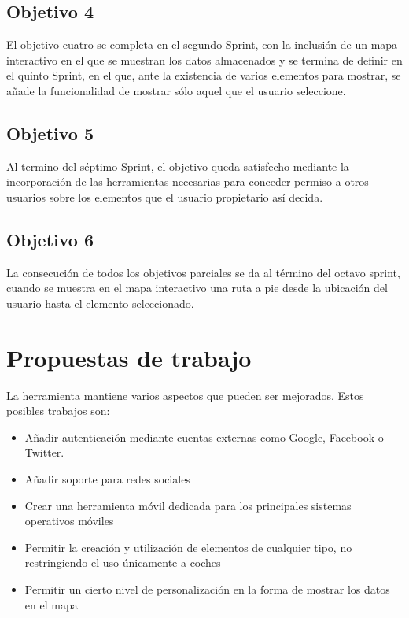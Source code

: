 \subsection{Objetivo 4}
El objetivo cuatro se completa en el segundo Sprint, con la inclusión de un mapa interactivo en el que se muestran los datos almacenados y se termina de definir en el quinto Sprint, en el que, ante la existencia de varios elementos para mostrar, se añade la funcionalidad de mostrar sólo aquel que el usuario seleccione.

\subsection{Objetivo 5}
Al termino del séptimo Sprint, el objetivo queda satisfecho mediante la incorporación de las herramientas necesarias para conceder permiso a otros usuarios sobre los elementos que el usuario propietario así decida.

\subsection{Objetivo 6}
La consecución de todos los objetivos parciales se da al término del octavo sprint, cuando se muestra en el mapa interactivo una ruta a pie desde la ubicación del usuario hasta el elemento seleccionado.

\section{Propuestas de trabajo}
La herramienta mantiene varios aspectos que pueden ser mejorados. Estos posibles trabajos son:

\begin{itemize}[label={$\bullet$},labelindent=\parindent,leftmargin=2cm]
	\item Añadir autenticación mediante cuentas externas como Google, Facebook o Twitter.
	\item Añadir soporte para redes sociales
	\item Crear una herramienta móvil dedicada para los principales sistemas operativos móviles
	\item Permitir la creación y utilización de elementos de cualquier tipo, no restringiendo el uso únicamente a coches
	\item Permitir un cierto nivel de personalización en la forma de mostrar los datos en el mapa
\end{itemize}

